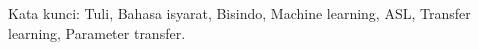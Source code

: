 \lipsum[8-9]

Kata kunci: Tuli, Bahasa isyarat, Bisindo, Machine learning, ASL, Transfer learning, Parameter transfer.